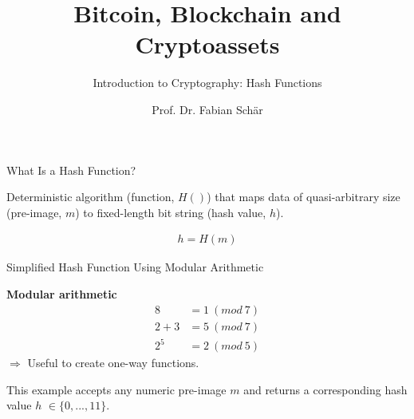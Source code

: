 \documentclass[]{beamer}
\title{Bitcoin, Blockchain and Cryptoassets}
\subtitle{Introduction to Cryptography: Hash Functions}
\author{Prof. Dr. Fabian Schär}
\institute{University of Basel}
\begin{document}
\thispagestyle{empty}
\begin{frame}[noframenumbering]
	\titlepage
\end{frame}

\begin{frame}{What Is a Hash Function?}

Deterministic algorithm (\color{focus}function, $H()$\color{black}) that maps data of quasi-arbitrary size (\color{focus}pre-image, $m$\color{black}) to fixed-length bit string (\color{focus}hash value, $h$\color{black}).

	\begin{align}
		h = H(m)
		\label{eq:hash_function}
	\end{align}

\vspace{1.5em}
	
	
\end{frame}


\begin{frame}{Simplified Hash Function Using Modular Arithmetic}
	\begin{minipage}[T]{0.65\textwidth}
	\textbf{Modular arithmetic}
				\begin{align*}
					8 &= 1\ (mod\ 7) \\
					2 + 3 &= 5\ (mod\ 7) \\
					2^5 &= 2\ (mod\ 5)
				\end{align*}
	$\Rightarrow$ Useful to create one-way functions.\\
	\end{minipage}
	\hfill
	\begin{minipage}[T]{0.3\textwidth}
		\begin{figure}[h!]
			\centering
			\resizebox{\linewidth}{!}{
			
			}
		\end{figure}
	\end{minipage}



This example accepts any numeric pre-image $m$ and returns a corresponding hash value $h$ $\in \{0,...,11\}$.


\end{frame}
\end{document}
